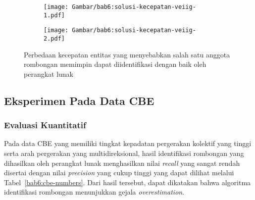 \begin{figure}[h]
    \centering
    \captionsetup{width=.7\textwidth}
    \begin{subfigure}[h]{0.235\textwidth}
        \centering
        \texttt{[image: Gambar/bab6:solusi-kecepatan-veiig-1.pdf]}
    \end{subfigure}
    \begin{subfigure}[h]{0.235\textwidth}
        \centering
        \texttt{[image: Gambar/bab6:solusi-kecepatan-veiig-2.pdf]}
    \end{subfigure}
    \caption[Penyelesaian masalah beda kecepatan pada data VEIIG]{Perbedaan kecepatan entitas yang menyebabkan salah satu anggota rombongan memimpin dapat diidentifikasi dengan baik oleh perangkat lunak}
    \label{bab6:solusi-beda-kecepatan-veiig}
\end{figure}

\subsection{Eksperimen Pada Data CBE}
\label{subsec:cbe-result}

\subsubsection{Evaluasi Kuantitatif}
\label{subsubsec:cbe-quantitative}

Pada data CBE yang memiliki tingkat kepadatan pergerakan kolektif yang tinggi serta arah pergerakan yang multidireksional, hasil identifikasi rombongan yang dihasilkan oleh perangkat lunak menghasilkan nilai \textit{recall} yang sangat rendah disertai dengan nilai \textit{precision} yang cukup tinggi yang dapat dilihat melalui Tabel~\ref{bab6:cbe-numbers}. Dari hasil tersebut, dapat dikatakan bahwa algoritma identifikasi rombongan menunjukkan gejala \textit{overestimation}.


